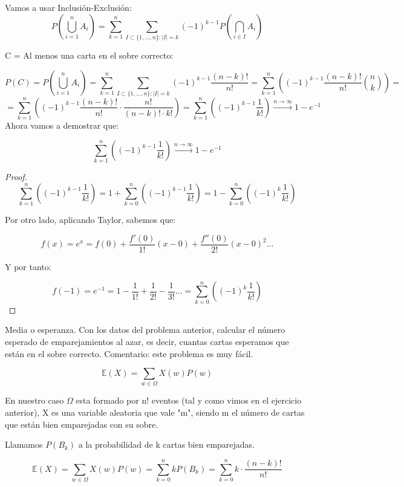 \begin{problem}[11]
Vamos a usar Inclusión-Exclusión:
\[
P(\bigcup_{i=1}^nA_i)=\sum_{k=1}^{n}\sum_{I\subset \{1,...,n\}:|I|=k}(-1)^{k-1}P(\bigcap_{i\in I}A_i)
\]

C = Al menos una carta en el sobre correcto: 

\[
P(C)=P(\bigcup_{i=1}^nA_i)=\sum_{k=1}^{n}\sum_{I\subset \{1,...,n\}:|I|=k}(-1)^{k-1}\frac{(n-k)!}{n!}=\sum_{k=1}^{n}\left( (-1)^{k-1}\frac{(n-k)!}{n!}\binom{n}{k}\right)=
\]
\[
= \sum_{k=1}^{n}\left( (-1)^{k-1}\frac{(n-k)!}{n!}\cdot \frac{n!}{(n-k)!\cdot k!}\right)= \sum_{k=1}^{n}\left( (-1)^{k-1}\frac{1}{k!}\right) \stackrel{n \rightarrow \infty}{\rightarrow} 1-e^{-1}
\]
Ahora vamos a demostrar que:

\[
\sum_{k=1}^{n}\left( (-1)^{k-1}\frac{1}{k!}\right) \stackrel{n \rightarrow \infty}{\rightarrow} 1-e^{-1}
\]

\begin{proof}
\[
\sum_{k=1}^{n}\left( (-1)^{k-1}\frac{1}{k!}\right) = 1 + \sum_{k=0}^{n}\left((-1)^{k-1}\frac{1}{k!}\right) = 1 - \sum_{k=0}^{n}\left((-1)^{k}\frac{1}{k!}\right)
\]

Por otro lado, aplicando Taylor, sabemos que:

\[
f(x)=e^x=f(0)+\frac{f'(0)}{1!}(x-0)+\frac{f''(0)}{2!}(x-0)^2...
\]

Y por tanto:

\[
f(-1)=e^{-1}=1-\frac{1}{1!}+\frac{1}{2!}-\frac{1}{3!}... = \sum_{k=0}^{n}\left((-1)^{k}\frac{1}{k!}\right)
\]
\end{proof}



\end{problem}


\begin{problem}[12] Media o esperanza. Con los datos del problema anterior, calcular el n\'umero esperado de
emparejamientos al azar, es decir, cuantas cartas esperamos que est\'an en el sobre correcto.
Comentario: este problema es muy f\'acil.
\solution

\begin{expla}
\[
\mathbb{E}(X) = \sum_{w \in \Omega} X(w)P(w)
\]

En nuestro caso $\Omega$ esta formado por n! eventos (tal y como vimos en el ejercicio anterior), X es una variable aleatoria que vale "m", siendo m el número de cartas que están bien emparejadas con su sobre.

Llamamos $P(B_k)$ a la probabilidad de k cartas bien emparejadas.
\end{expla}


\[
\mathbb{E}(X) = \sum_{w \in \Omega} X(w)P(w) = \sum_{k=0}^n kP(B_k) = \sum_{k=0}^n k\cdot\frac{(n-k)!}{n!}
\]


\end{problem}

